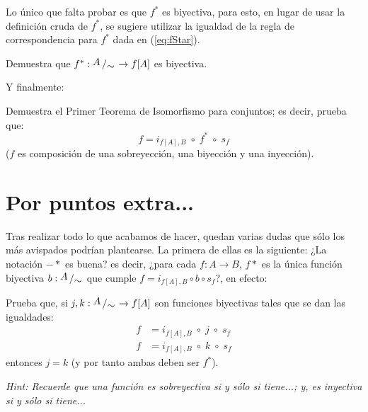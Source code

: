 \documentclass[letterpaper,DIV=14,headsepline,12pt]{scrartcl}
\newcommand{\pts}{}
\newenvironment{ejercicio}[1]{\ifthenelse{\equal{#1}{1} \OR \equal{#1}{+1}}{\renewcommand{\pts}{\textbf{(#1 pt)}}}{\renewcommand{\pts}{\textbf{(#1 pts)}}}\begin{ejj}\upshape \pts}{\end{ejj}}
\newcommand{\quot}[2]{{\raisebox{.2em}{$#1$}\left/\raisebox{-.2em}{$#2$}\right.}}
\begin{document}
    Lo único que falta probar es que $f^*$ es biyectiva, para esto, en lugar de usar la definición cruda de $f^*$, se sugiere utilizar la igualdad de la regla de correspondencia para $f^*$ dada en (\ref{eq:fStar}).

    \begin{ejercicio}{1}
        Demuestra que $f^*:\quot{A}{\sim} \to f[A]$ es biyectiva.
    \end{ejercicio}

    Y finalmente:
    \begin{ejercicio}{.5}
        Demuestra el Primer Teorema de Isomorfismo para conjuntos; es decir, prueba que:
        \[ f=i_{f[A],B} \; \circ \; f^* \; \circ \; s_f \]
        ($f$ es composición de una sobreyección, una biyección y una inyección).
    \end{ejercicio}

    \section*{Por puntos extra...}

    Tras realizar todo lo que acabamos de hacer, quedan varias dudas que sólo los más avispados podrían plantearse. La primera de ellas es la siguiente: ¿La notación $-*$ es buena? es decir, ¿para cada $f:A \to B$, $f*$ es la única función biyectiva $b:\quot{A}{\sim}$ que cumple $f=i_{f[A],B} \circ b \circ s_f$?, en efecto:
    
    \begin{ejercicio}{+2}
        Prueba que, si $j,k:\quot{A}{\sim} \to f[A]$ son funciones biyectivas tales que se dan las igualdades:
        \begin{align*}
            f & = i_{f[A],B} \; \circ \; j \; \circ \; s_f \\
            f & = i_{f[A],B} \; \circ \; k \; \circ \; s_f
        \end{align*}
        entonces $j=k$ (y por tanto ambas deben ser $f^*$).
        
        \textit{Hint: Recuerde que una función es sobreyectiva si y sólo si tiene...; y, es inyectiva si y sólo si tiene...}
    \end{ejercicio}
\end{document}
